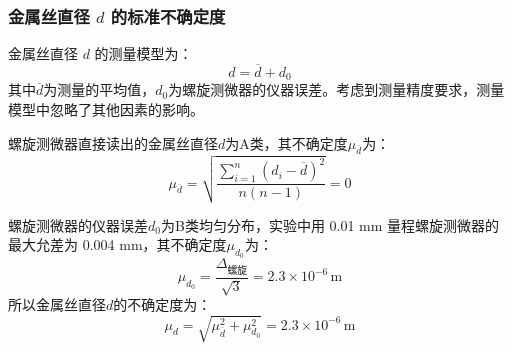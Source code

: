 \documentclass[a4paper]{extarticle}
\begin{document}
    \subsubsection{金属丝直径 $d$ 的标准不确定度}
    \hspace{2em}
    金属丝直径 $d$ 的测量模型为：
    \begin{equation*}
        d=\overline{d}+d_0
    \end{equation*}
    其中$\overline{d}$为测量的平均值，$d_0$为螺旋测微器的仪器误差。考虑到测量精度要求，测量模型中忽略了其他因素的影响。
    \par\hspace{2em}
    螺旋测微器直接读出的金属丝直径$d$为A类，其不确定度$\mu_{\overline{d}}$为：
    \begin{equation*}
        \mu_{\overline{d}}=\sqrt{\frac{\sum\limits_{i=1}^{n}(d_i-\overline{d})^2}{n(n-1)}}=0
    \end{equation*}
    \par\hspace{2em}
    螺旋测微器的仪器误差$d_0$为B类均匀分布，实验中用 0.01 mm 量程螺旋测微器的最大允差为 0.004 mm，其不确定度$\mu_{d_0}$为：
    \begin{equation*}
        \mu_{d_0}=\frac{\Delta_\text{螺旋}}{\sqrt{3}}=2.3\times10^{-6}\,\text{m}
    \end{equation*}
    \hspace{2em}
    所以金属丝直径$d$的不确定度为：
    \begin{equation*}
        \mu_d=\sqrt{\mu_{\overline{d}}^2+\mu_{d_0}^2}=2.3\times10^{-6}\,\text{m}
    \end{equation*}
\end{document}
